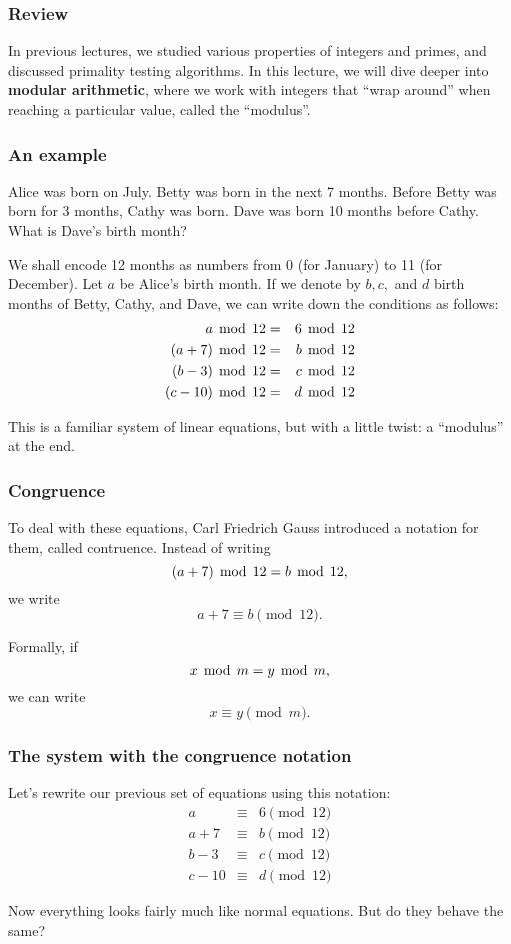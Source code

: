 

\begin{frame}\frametitle{Review}
  In previous lectures, we studied various properties of integers and
  primes, and discussed primality testing algorithms.  In this
  lecture, we will dive deeper into {\bf modular arithmetic}, where we
  work with integers that ``wrap around'' when reaching a particular
  value, called the ``modulus''.
\end{frame}

\begin{frame}\frametitle{An example}
  \begin{tcolorbox}
    Alice was born on July.  Betty was born in the next 7 months.
    Before Betty was born for 3 months, Cathy was born.  Dave was born
    10 months before Cathy.  What is Dave's birth month?
  \end{tcolorbox}

  \pause We shall encode 12 months as numbers from 0 (for January) to
  11 (for December).  Let $a$ be Alice's birth month.  If we denote by
  $b,c,$ and $d$ birth months of Betty, Cathy, and Dave, we can write
  down the conditions as follows:
  \pause
  \begin{eqnarray*}
    a \,\bmod\, 12 &=& 6\,\bmod\, 12\\
    (a + 7) \,\bmod\, 12 &=& b \,\bmod\, 12 \\
    (b - 3) \,\bmod\, 12 &=& c \,\bmod\, 12 \\
    (c - 10) \,\bmod\, 12 &=& d \,\bmod\, 12
  \end{eqnarray*}
  
  \pause This is a familiar system of linear equations, but with a
  little twist: a ``modulus'' at the end.
\end{frame}

\begin{frame}\frametitle{Congruence}
  To deal with these equations, Carl Friedrich Gauss introduced a
  notation for them, called contruence.  Instead of writing
  \[ (a+7)\,\bmod\, 12 = b \,\bmod\, 12,\]
  we write
  \[ a+7 \equiv b \pmod {12}.\]
  \pause

  Formally, if
  \[ x\,\bmod\, m = y\,\bmod\, m, \]
  we can write
  \[ x \equiv y \pmod m.\]
\end{frame}

\begin{frame}\frametitle{The system with the congruence notation}
  Let's rewrite our previous set of equations using this notation:
  \begin{eqnarray*}
    a &\equiv& 6 \pmod {12}\\
    a + 7 &\equiv& b \pmod {12} \\
    b - 3 &\equiv& c \pmod {12} \\
    c - 10 &\equiv& d \pmod {12}
  \end{eqnarray*}

  Now everything looks fairly much like normal equations.  But do they
  behave the same?
\end{frame}
